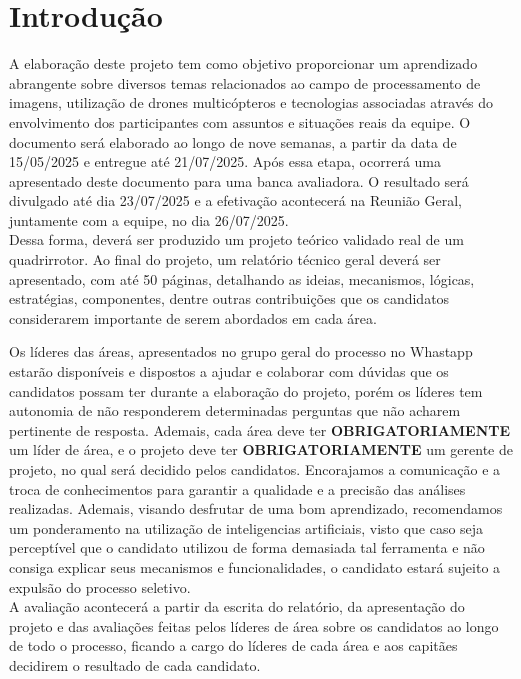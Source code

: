 \section{Introdução}

A elaboração deste projeto tem como objetivo proporcionar um aprendizado abrangente sobre diversos temas relacionados ao campo de processamento de imagens, utilização de drones multicópteros e tecnologias associadas através do envolvimento dos participantes com assuntos e situações reais da equipe. O  documento será elaborado ao longo de nove semanas, a partir da data de 15/05/2025 e entregue até 21/07/2025. Após essa etapa, ocorrerá uma apresentado deste documento para uma banca avaliadora. O resultado será divulgado até dia 23/07/2025 e a efetivação acontecerá na Reunião Geral, juntamente com a equipe, no dia 26/07/2025.\\

Dessa forma, deverá ser produzido um projeto teórico validado real de um quadrirrotor. Ao final do projeto, um relatório técnico geral deverá ser apresentado, com até 50 páginas, detalhando as ideias, mecanismos, lógicas, estratégias, componentes, dentre outras contribuições que os candidatos considerarem importante de serem abordados em cada área. 

Os líderes das áreas, apresentados no grupo geral do processo no Whastapp estarão disponíveis e dispostos a ajudar e colaborar com dúvidas que os candidatos possam ter durante a elaboração do projeto, porém os líderes tem autonomia de não responderem determinadas perguntas que não acharem pertinente de resposta. Ademais, cada área deve ter \textbf{OBRIGATORIAMENTE} um líder de área, e o projeto deve ter \textbf{OBRIGATORIAMENTE} um gerente de projeto, no qual será decidido pelos candidatos. Encorajamos a comunicação e a troca de conhecimentos para garantir a qualidade e a precisão das análises realizadas. Ademais, visando desfrutar de uma bom aprendizado, recomendamos um ponderamento na utilização de inteligencias artificiais, visto que caso seja perceptível que o candidato utilizou de forma demasiada tal ferramenta e não consiga explicar seus mecanismos e funcionalidades, o candidato estará sujeito a expulsão do processo seletivo. \\

A avaliação acontecerá a partir da escrita do relatório, da apresentação do projeto e das avaliações feitas pelos líderes de área sobre os candidatos ao longo de todo o processo, ficando a cargo do líderes de cada área e aos capitães decidirem o resultado de cada candidato.

